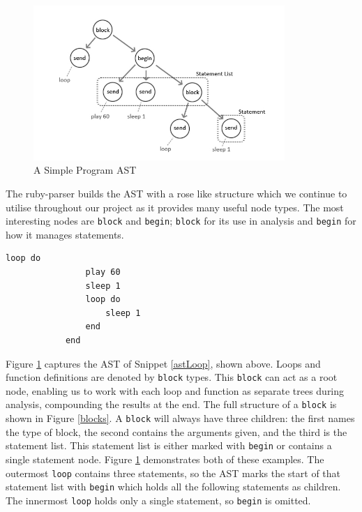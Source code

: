 \documentclass[11pt, abstracton, twoside, titlepage=true]{scrartcl}
\begin{document}
\begin{figure}[h!]
	\centering
	\includegraphics[width=0.85\textwidth]{images/program.jpg}
	\caption{A Simple Program AST} \label{program}
\end{figure}

The ruby-parser builds the AST with a rose like structure which we continue to 
utilise throughout our project as it provides many useful node types. The most 
interesting nodes are \texttt{block} and \texttt{begin}; \texttt{block} for its 
use in analysis and \texttt{begin} for how it manages statements. 

\begin{minipage}{\textwidth}
	\begin{lstlisting}[style = sonicpi]
            loop do
                play 60
                sleep 1
                loop do
                    sleep 1
                end
            end
	\end{lstlisting}
	 \label{astLoop}
\end{minipage}

Figure \ref{program} captures the AST of Snippet \ref{astLoop}, shown above. 
Loops and function definitions are denoted by \texttt{block} types. This \texttt{block}
can act as a root node, enabling us to work with each loop and function as separate 
trees during analysis, compounding the results at the end. The full structure of a 
\texttt{block} is shown in Figure \ref{blocks}. A \texttt{block} will 
always have three children: the first names the type of block, the second contains 
the arguments given, and the third is the statement list. This statement list is 
either marked with \texttt{begin} or contains a single statement node. Figure 
\ref{program} demonstrates both of these examples. The outermost \texttt{loop} 
contains three statements, so the AST marks the start of that statement list with 
\texttt{begin} which holds all the following statements as children. The innermost 
\texttt{loop} holds only a single statement, so \texttt{begin} is omitted.
\end{document}
